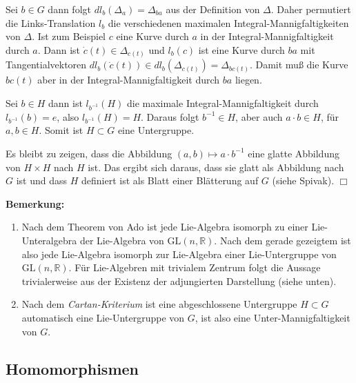\documentclass[12pt,a4paper]{article}
\def\R{\mathbb{R}}
\def\GL{\mathrm{GL}}
\def\qed{\quad\hfill\ensuremath{\Box}}
\begin{document}
\medskip

Sei $b\in G$ dann folgt $dl_b(\Delta_a) = \Delta_{ba}$ aus der Definition von $\Delta$. Daher
permutiert die Links-Translation $l_b$ die verschiedenen maximalen Integral-Mannigfaltigkeiten
von $\Delta$. Ist zum Beispiel $c$ eine Kurve durch $a$ in der Integral-Mannigfaltigkeit durch $a$. Dann
ist $\dot c(t) \in \Delta_{c(t)}$  und $l_b(c)$ ist eine Kurve durch $ba$ mit Tangentialvektoren
$ dl_b(\dot c(t)) \in dl_b(\Delta_{c(t)})=\Delta_{bc(t)}$. Damit mu\ss{} die Kurve $bc(t)$ aber in
der Integral-Mannigfaltigkeit durch $ba$ liegen.

\medskip

Sei $b\in H$ dann ist $l_{b^{-1}}(H)$ die maximale Integral-Mannigfaltigkeit durch $l_{b^{-1}}(b)=e$,
also $l_{b^{-1}}(H) = H$. Daraus folgt $b^{-1}\in H$, aber auch $a\cdot b\in H$, f\"ur $a, b\in H$.
Somit ist $H\subset G$ eine Untergruppe.

\medskip

Es bleibt zu zeigen, dass die Abbildung $(a, b)\mapsto a\cdot b^{-1}$ eine glatte Abbildung von
$H\times H$ nach $H$ ist. Das ergibt sich daraus, dass sie glatt als Abbildung nach $G$ ist
und dass $H$ definiert ist als Blatt einer Bl\"atterung auf $G$ (siehe Spivak).
\qed

\bigskip

{\bf Bemerkung:}
\begin{enumerate}
\item
Nach dem Theorem von Ado ist jede Lie-Algebra isomorph zu einer Lie-Unteralgebra
der Lie-Algebra von $\GL(n,\R)$. Nach dem gerade gezeigtem ist also jede
Lie-Algebra isomorph zur Lie-Algebra einer Lie-Untergruppe von $\GL(n,\R)$.
F\"ur Lie-Algebren mit trivialem Zentrum folgt die Aussage trivialerweise
aus der Existenz der adjungierten Darstellung (siehe unten).
\item
Nach dem {\it Cartan-Kriterium} ist eine abgeschlossene Untergruppe $H\subset G$
automatisch eine Lie-Untergruppe von $G$, ist also eine Unter-Mannigfaltigkeit
von $G$.
\end{enumerate}


\bigskip

\subsection{Homomorphismen}
\end{document}
